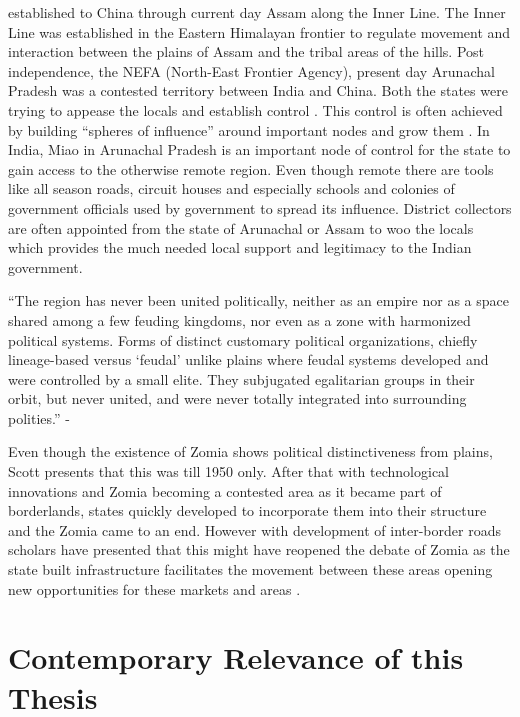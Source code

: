 established to China through current day Assam along the Inner Line. The Inner Line was established in the Eastern Himalayan frontier to regulate movement and interaction between the plains of Assam and the tribal areas of the hills. Post independence, the NEFA (North-East Frontier Agency), present day Arunachal Pradesh was a contested territory between India and China. Both the states were trying to appease the locals and establish control \citep{guyot2017shadow}. This control is often achieved by building \enquote{spheres of influence} around important nodes and grow them \citep{Farrelly_2013b}. In India, Miao in Arunachal Pradesh is an important node of control for the state to gain access to the otherwise remote region. Even though remote there are tools like all season roads, circuit houses and especially schools and colonies of government officials used by government to spread its influence. District collectors are often appointed from the state of Arunachal or Assam to woo the locals which provides the much needed local support and legitimacy to the Indian government.  

\vspace{0.3cm}

 \enquote{The region has never been united politically, neither as an empire nor as a space shared among a few feuding kingdoms, nor even as a zone with harmonized political systems. Forms of distinct customary political organizations, chiefly lineage-based versus \enquote{feudal} unlike plains where feudal systems developed and were controlled by a small elite. They subjugated egalitarian groups in their orbit, but never united, and were never totally integrated into surrounding polities.} - \citep{michaud2017s}

\vspace{0.3cm}

 Even though the existence of Zomia shows political distinctiveness from plains, Scott presents that this was till 1950 only. After that with technological innovations and Zomia becoming a contested area as it became part of borderlands, states quickly developed to incorporate them into their structure and the Zomia came to an end. However with development of inter-border roads scholars have presented that this might have reopened the debate of Zomia as the state built infrastructure facilitates the movement between these areas opening new opportunities for these markets and areas \citep{murton2013himalayan}. 

 \section{Contemporary Relevance of this Thesis}


